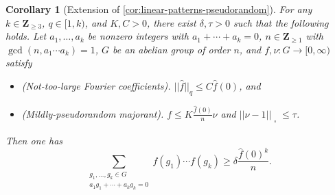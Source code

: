 \documentclass[reqno,11pt]{amsart}
\newtheorem{corollary}[theorem]{Corollary}
\theoremstyle{definition}
\theoremstyle{remark}
\numberwithin{equation}{section}
\newcommand{\Z}{\mathbf{Z}}
\renewcommand{\hat}{\widehat}
\newcommand{\sq}{_{\substack{ \\ \square}}}
\begin{document}
\begin{corollary}[Extension of \cref{cor:linear-patterns-pseudorandom}] \label{cor:linear-patterns-pseudorandom-weighted}
For any $k \in \Z_{\ge 3}$, $q \in [1, k)$, and $K, C > 0$, there exist $\delta, \tau > 0$ such that the following holds. Let $a_1, \ldots, a_k$ be nonzero integers with $a_1 + \cdots + a_k = 0$, $n \in \Z_{\ge 1}$ with $\gcd(n, a_1 \cdots a_k) = 1$, $G$ be an abelian group of order $n$, and $f, \nu : G \to [0, \infty)$ satisfy
\begin{itemize}
    \item[$(i)$] \emph{(Not-too-large Fourier coefficients).}  $||\hat{f}||_{q} \le C\hat{f}(0)$, and
    \item[$(ii)$] \emph{(Mildly-pseudorandom majorant).} $f \le K \frac{\hat{f}(0)}{n} \nu$ and $||\nu - 1||\sq \le \tau$. 
\end{itemize}
Then one has
\[
    \sum_{\substack{g_1, \ldots, g_k \in G \\ a_1 g_1 + \cdots + a_k g_k = 0}} 
    f(g_1) \cdots f(g_k) 
    \ge 
    \delta \frac{\hat{f}(0)^k}{n}.
\]
\end{corollary}
\end{document}
